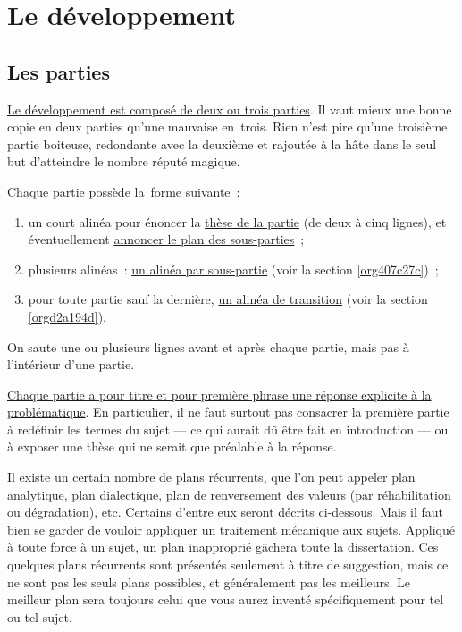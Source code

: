 \documentclass[a4paper,12pt]{article}
\begin{document}
\section{Le développement}
\label{sec:org7ec99e8}
\label{orgce2e865}

\subsection{Les parties}
\label{sec:orgc69490d}
\label{orgb8b493d}

\uline{Le développement est composé de deux ou trois parties}. Il vaut mieux
une bonne copie en deux parties qu'une mauvaise en trois. Rien n'est
pire qu'une troisième partie boiteuse, redondante avec la deuxième et
rajoutée à la hâte dans le seul but d'atteindre le nombre réputé
magique.

Chaque partie possède la forme suivante :

\begin{enumerate}
\item un court alinéa pour énoncer la \uline{thèse de la partie} (de deux à cinq
lignes), et éventuellement \uline{annoncer le plan des sous-parties} ;
\item plusieurs alinéas : \uline{un alinéa par sous-partie} (voir la section
\ref{org407c27c}) ;
\item pour toute partie sauf la dernière, \uline{un alinéa de transition} (voir
la section \ref{orgd2a194d}).
\end{enumerate}

On saute une ou plusieurs lignes avant et après chaque partie, mais pas
à l'intérieur d'une partie.

\uline{Chaque partie a pour titre et pour première phrase une réponse
explicite à la problématique}. En particulier, il ne faut surtout pas
consacrer la première partie à redéfinir les termes du sujet --- ce qui
aurait dû être fait en introduction --- ou à exposer une thèse qui ne
serait que préalable à la réponse.

Il existe un certain nombre de plans récurrents, que l'on peut appeler
plan analytique, plan dialectique, plan de renversement des valeurs (par
réhabilitation ou dégradation), etc. Certains d'entre eux seront décrits
ci-dessous. Mais il faut bien se garder de vouloir appliquer un
traitement mécanique aux sujets. Appliqué à toute force à un sujet, un
plan inapproprié gâchera toute la dissertation. Ces quelques plans
récurrents sont présentés seulement à titre de suggestion, mais ce ne
sont pas les seuls plans possibles, et généralement pas les meilleurs.
Le meilleur plan sera toujours celui que vous aurez inventé
spécifiquement pour tel ou tel sujet.
\end{document}
